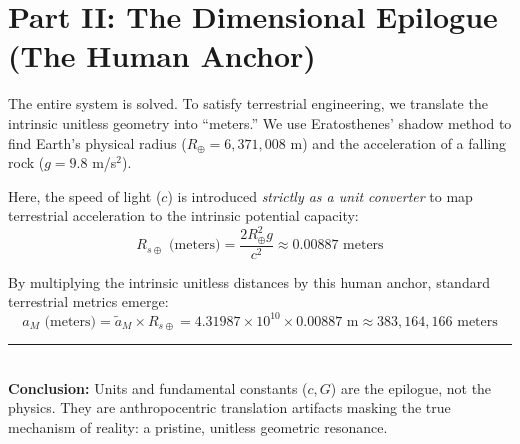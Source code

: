 \documentclass[11pt, a4paper]{article}
\begin{document}
\section{Part II: The Dimensional Epilogue (The Human Anchor)}
The entire system is solved. To satisfy terrestrial engineering, we translate the intrinsic unitless geometry into ``meters.'' We use Eratosthenes' shadow method to find Earth's physical radius ($R_\oplus = 6,371,008$ m) and the acceleration of a falling rock ($g = 9.8$ m/s$^2$).

Here, the speed of light ($c$) is introduced \textit{strictly as a unit converter} to map terrestrial acceleration to the intrinsic potential capacity:
\begin{equation}
    R_{s\oplus} \text{ (meters)} = \frac{2 R_\oplus^2 g}{c^2} \approx 0.00887 \text{ meters}
\end{equation}

By multiplying the intrinsic unitless distances by this human anchor, standard terrestrial metrics emerge:
\begin{equation}
    a_M \text{ (meters)} = \tilde{a}_M \times R_{s\oplus} = 4.31987 \times 10^{10} \times 0.00887 \text{ m} \approx 383,164,166 \text{ meters}
\end{equation}

\vspace{0.5cm}
\noindent \rule{\textwidth}{0.4pt} \\
\textbf{Conclusion:} Units and fundamental constants ($c, G$) are the epilogue, not the physics. They are anthropocentric translation artifacts masking the true mechanism of reality: a pristine, unitless geometric resonance.
\end{document}
